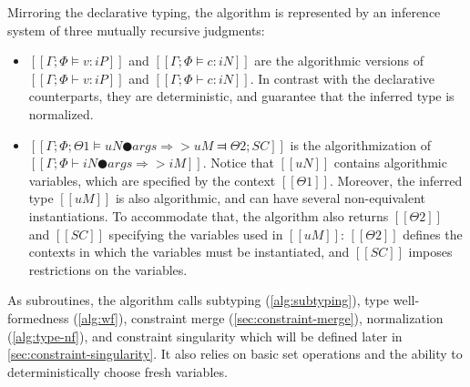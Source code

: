 \documentclass[acmsmall,natbib=false,review,anonymous]{acmart}
\begin{document}
Mirroring the declarative typing, 
the algorithm is represented by an inference system of three mutually recursive
judgments:
\begin{itemize}
  \item $[[Γ ; Φ ⊨ v : iP]]$ and  $[[Γ ; Φ ⊨ c : iN]]$
    are the algorithmic versions of $[[Γ ; Φ ⊢ v : iP]]$ and $[[Γ ; Φ ⊢ c : iN]]$.
    In contrast with the declarative counterparts, they are deterministic,
    and guarantee that the inferred type is normalized. 
  \item $[[Γ ; Φ ; Θ1 ⊨ uN ● args ⇒> uM ⫤ Θ2 ; SC]]$
    is the algorithmization of $[[Γ ; Φ ⊢ iN ● args ⇒> iM]]$.
    Notice that $[[uN]]$ contains algorithmic variables, 
    which are specified by the context $[[Θ1]]$.
    Moreover, the inferred type $[[uM]]$ is also algorithmic,
    and can have several non-equivalent instantiations. To accommodate that, 
    the algorithm also returns $[[Θ2]]$ and $[[SC]]$ specifying 
    the variables used in $[[uM]]$: $[[Θ2]]$ defines the contexts
    in which the variables must be instantiated, and $[[SC]]$
    imposes restrictions on the variables. 
\end{itemize}
As subroutines, the algorithm calls
subtyping (\cref{alg:subtyping}),
type well-formedness (\cref{alg:wf}),
constraint merge (\cref{sec:constraint-merge}),
normalization (\cref{alg:type-nf}),
and constraint singularity which will be defined later in 
\cref{sec:constraint-singularity}.
It also relies on basic set operations and the ability to 
deterministically choose fresh variables.

\begin{algorithm}
  \hfill \\
  \ottdefnATPInfLabeled{}
  \hfill \\
  \ottdefnATNInfLabeled{}
  \hfill \\
  \ottdefnATSpinInfLabeled{}
\end{algorithm}
\end{document}

